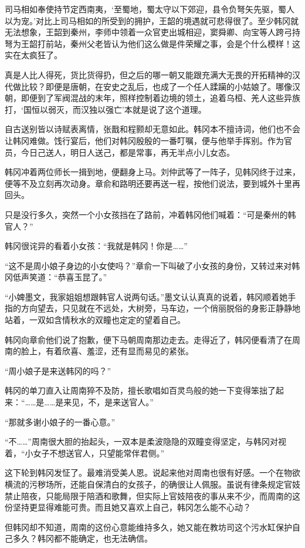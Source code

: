司马相如奉使持节定西南夷，‘至蜀地，蜀太守以下郊迎，县令负弩矢先驱，蜀人以为宠。’对比上司马相如的所受到的拥护，王韶的境遇就可悲得很了。至少韩冈就无法想象，王韶到秦州，李师中领着一众官吏出城相迎，窦舜卿、向宝等人跨弓持弩为王韶打前站，秦州父老皆认为他们这么做是件荣耀之事，会是个什么模样！这实在太疯狂了。

真是人比人得死，货比货得扔，但之后的哪一朝又能跟充满大无畏的开拓精神的汉代做比较？即便是唐朝，在安史之乱后，也成了一个任人蹂躏的小姑娘了。哪像汉朝，即便到了军阀混战的末年，照样控制着边境的领土，追着乌桓、羌人这些异族打，‘国恒以弱灭，而汉独以强亡’本就是说了这个道理。

自古送别皆以诗赋表离情，张戬和程颢却无意如此。韩冈本不擅诗词，他们也不会让韩冈难做。饯行宴后，他们对韩冈殷殷的一番叮嘱，便与他举手挥别。作为官员，今日己送人，明日人送己，都是常事，再无半点小儿女态。

韩冈冲着两位师长一揖到地，便翻身上马。刘仲武等了一阵子，见韩冈终于过来，便等不及立刻再次动身。章俞和路明还要再送一程，按他们说法，要到城外十里再回头。

只是没行多久，突然一个小女孩挡在了路前，冲着韩冈他们喊着：“可是秦州的韩官人？”

韩冈很诧异的看着小女孩：“我就是韩冈！你是……”

“这不是周小娘子身边的小女使吗？”章俞一下叫破了小女孩的身份，又转过来对韩冈低声笑道：“恭喜玉昆了。”

“小婢墨文，我家姐姐想跟韩官人说两句话。”墨文认认真真的说着，韩冈顺着她手指的方向望去，只见就在不远处，大树旁，马车边，一个俏丽脱俗的身影正静静地站着，一双如含情秋水的双瞳也定定的望着自己。

韩冈向章俞他们说了抱歉，便下马朝周南那边走去。走得近了，韩冈便看清了在周南的脸上，有着欣喜、羞涩，还有显而易见的紧张。

“周小娘子是来送韩冈的吗？”

韩冈的单刀直入让周南猝不及防，擅长歌唱如百灵鸟般的她一下变得笨拙了起来：“……是……是来见，不，是来送官人。”

“那就多谢小娘子的一番心意。”

“不……”周南很大胆的抬起头，一双本是柔波隐隐的双瞳变得坚定，与韩冈对视着，“小女子不想送官人，只望能常伴君侧。”

这下轮到韩冈发怔了。最难消受美人恩。说起来他对周南也很有好感。一个在物欲横流的污秽场所，还能自保清白的女孩子，的确很让人佩服。虽说有律条规定官妓禁止陪夜，只能局限于陪酒和歌舞，但实际上官妓陪夜的事从来不少，而周南的这份坚持更显得难能可贵。而且她又喜欢上自己，韩冈怎么能不心动？

但韩冈却不知道，周南的这份心意能维持多久，她又能在教坊司这个污水缸保护自己多久？韩冈都不能确定，也无法确信。

